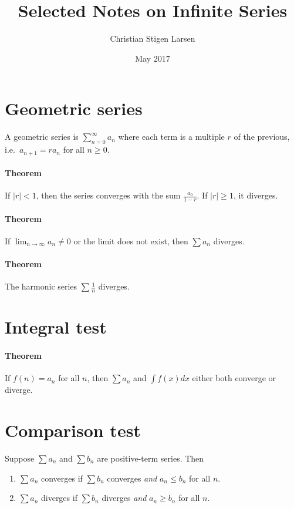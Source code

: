 \documentclass[a4paper,twocolumn,10pt]{article}
\title{Selected Notes on Infinite Series}
\author{Christian Stigen Larsen}
\date{May 2017}
\begin{document}
  \maketitle
  \section{Geometric series}
  A geometric series is $\sum_{n=0}^{\infty} a_n$ where each term is a multiple
  $r$ of the previous, i.e.~$a_{n+1} = ra_n$ for all $n \geq 0$.

  \paragraph{Theorem} If $|r| < 1$, then the series converges with the sum
  $\frac{a_0}{1-r}$. If $|r| \geq 1$, it diverges.

  \paragraph{Theorem} If $\lim_{n \to \infty} a_n \neq 0$ or the limit does not
  exist, then $\sum a_n$ diverges.

  \paragraph{Theorem} The harmonic series $\sum \frac{1}{n}$ diverges.

  \section{Integral test}
  \paragraph{Theorem} If $f(n) = a_n$ for all $n$, then $\sum a_n$ and $\int
  f(x) dx$ either both converge or diverge.

  \section{Comparison test}
  Suppose $\sum a_n$ and $\sum b_n$ are positive-term series. Then
  \begin{enumerate}
    \item $\sum a_n$ converges if $\sum b_n$ converges \textit{and} $a_n \leq
      b_n$ for all $n$.
    \item $\sum a_n$ diverges if $\sum b_n$ diverges \textit{and} $a_n \geq
      b_n$ for all $n$.
  \end{enumerate}
\end{document}
